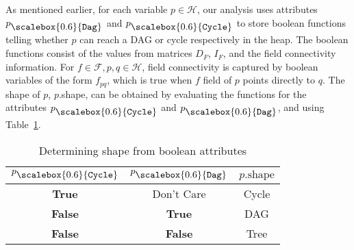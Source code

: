 \documentclass[letterpaper]{sig-alternate}
\newcommand{\p}{\ensuremath{p}}
\newcommand{\q}{\ensuremath{q}}
\newcommand{\heap}{\ensuremath{\mathcal{H}}}
\newcommand{\fields}{\ensuremath{\mathcal{F}}}
\newcommand{\shape}{\mbox{shape}}
\newcommand{\subC}{\mbox{\scalebox{0.6}{\Cycle}}}
\newcommand{\subD}{\mbox{\scalebox{0.6}{\Dag}}}
\newcommand{\Dag}{{\tt Dag}}
\newcommand{\Cycle}{{\tt Cycle}}
\newcommand{\false}{\textbf{False}}
\newcommand{\true}{\textbf{True}}
\begin{document}
As mentioned earlier, for each variable $\p \in \heap$, our
analysis uses attributes $\p_{\subD}$ and $\p_{\subC}$ to
store boolean functions telling whether $\p$ can reach a DAG or
cycle respectively in the heap. The boolean functions
consist of the values from matrices $D_F$, $I_F$, and the field
connectivity information. For $f \in \fields, \p, \q \in
\heap$, field connectivity is captured by boolean variables
of the form $f_{pq}$, which is true when $f$ field of $\p$ points
directly to $\q$. 
The shape of \p, \p.\shape, can be obtained by evaluating
the functions for the attributes $\p_{\subC}$ and
$\p_{\subD}$, and using Table~\ref{tbl:det_shape}.
\begin{table}
\caption{Determining shape from boolean
  attributes\label{tbl:det_shape}}
\begin{center}
\begin{tabular}{|c|c|c|}
\hline
$\p_{\subC}$ & $\p_{\subD}$ & $\p.\shape$ \\ 
\hline
\true  & Don't Care  & Cycle        \\ 
\false  & \true          & DAG    \\ 
\false  & \false          & Tree   \\ 
\hline
\end{tabular}
\end{center}
\end{table}
\end{document}

